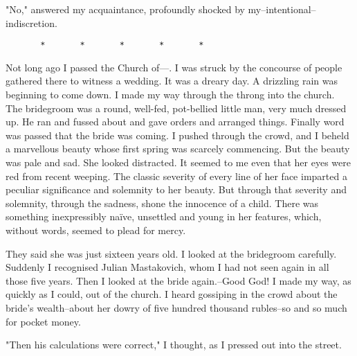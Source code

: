 "No," answered my acquaintance, profoundly shocked by
my--intentional--indiscretion.

\begin{center}
    \begin{verbatim}
       *       *       *       *       *
    \end{verbatim}
\end{center}

Not long ago I passed the Church of---. I was struck by the concourse
of people gathered there to witness a wedding. It was a dreary day. A
drizzling rain was beginning to come down. I made my way through the
throng into the church. The bridegroom was a round, well-fed,
pot-bellied little man, very much dressed up. He ran and fussed about
and gave orders and arranged things. Finally word was passed that the
bride was coming. I pushed through the crowd, and I beheld a
marvellous beauty whose first spring was scarcely commencing. But the
beauty was pale and sad. She looked distracted. It seemed to me even
that her eyes were red from recent weeping. The classic severity of
every line of her face imparted a peculiar significance and solemnity
to her beauty. But through that severity and solemnity, through the
sadness, shone the innocence of a child. There was something
inexpressibly naïve, unsettled and young in her features, which,
without words, seemed to plead for mercy.

They said she was just sixteen years old. I looked at the bridegroom
carefully. Suddenly I recognised Julian Mastakovich, whom I had not
seen again in all those five years. Then I looked at the bride
again.--Good God! I made my way, as quickly as I could, out of the
church. I heard gossiping in the crowd about the bride's wealth--about
her dowry of five hundred thousand rubles--so and so much for pocket
money.

"Then his calculations were correct," I thought, as I pressed out into
the street.
